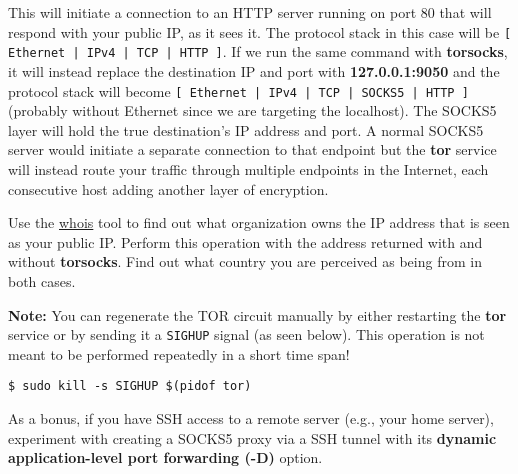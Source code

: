 This will initiate a connection to an HTTP server running on port 80 that will
respond with your public IP, as it sees it. The protocol stack in this case will
be \texttt{[ Ethernet | IPv4 | TCP | HTTP ]}. If we run the same command with
\textbf{torsocks}, it will instead replace the destination IP and port with
\textbf{127.0.0.1:9050} and the protocol stack will become \texttt{[ Ethernet
| IPv4 | TCP | SOCKS5 | HTTP ]} (probably without Ethernet since we are
targeting the localhost). The SOCKS5 layer will hold the true destination's
IP address and port. A normal SOCKS5 server would initiate a separate connection
to that endpoint but the \textbf{tor} service will instead route your traffic
through multiple endpoints in the Internet, each consecutive host adding
another layer of encryption.

Use the \href{https://man.archlinux.org/man/whois.1}{whois} tool to find out
what organization owns the IP address that is seen as your public IP. Perform
this operation with the address returned with and without \textbf{torsocks}.
Find out what country you are perceived as being from in both cases.

\textbf{Note:} You can regenerate the TOR circuit manually by either restarting
the \textbf{tor} service or by sending it a \texttt{SIGHUP} signal (as seen
below). This operation is not meant to be performed repeatedly in a short time
span!

\begin{lstlisting}[style=bashstyle]
$ sudo kill -s SIGHUP $(pidof tor)
\end{lstlisting}

As a bonus, if you have SSH access to a remote server (e.g., your home server),
experiment with creating a SOCKS5 proxy via a SSH tunnel with its
\textbf{dynamic application-level port forwarding (-D)} option.

